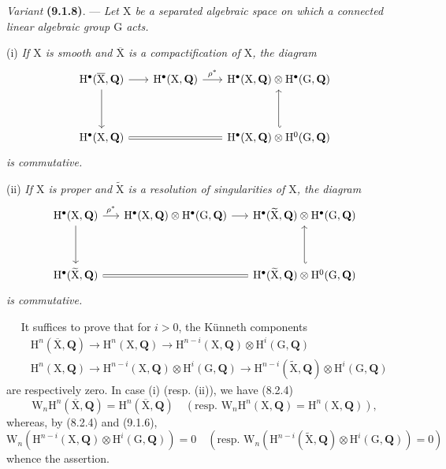 \documentclass[11pt,leqno]{article}
\newcommand{\Page}[1]{\ifvmode\noindent\else\unskip\ \fi{\footnotesize\textcolor{gray}{[p.\,#1]}}\ \ignorespaces}
\begin{document}
\textit{Variant} \textbf{(9.1.8)}. — \textit{Let \(\mathrm{X}\) be a separated algebraic space on which a connected linear algebraic group \(\mathrm{G}\) acts.}

(i) \textit{If \(\mathrm{X}\) is smooth and \(\overline{\mathrm{X}}\) is a compactification of \(\mathrm{X}\), the diagram}
\[
\begin{tikzcd}[ampersand replacement=\&, column sep=1.8em, row sep=3.5em]
\mathrm{H}^{\bullet}(\overline{\mathrm{X}},\mathbf{Q})
  \arrow[r] \arrow[d]
\&
\mathrm{H}^{\bullet}(\mathrm{X},\mathbf{Q})
  \arrow[r, "\rho^{*}"]
\&
\mathrm{H}^{\bullet}(\mathrm{X},\mathbf{Q})\otimes
\mathrm{H}^{\bullet}(\mathrm{G},\mathbf{Q})
\\
\mathrm{H}^{\bullet}(\mathrm{X},\mathbf{Q})
  \arrow[rr, equal]
\& \&
\mathrm{H}^{\bullet}(\mathrm{X},\mathbf{Q})\otimes
\mathrm{H}^{0}(\mathrm{G},\mathbf{Q})
  \arrow[u, hook']
\end{tikzcd}
\]
\textit{is commutative.}

(ii) \textit{If \(\mathrm{X}\) is proper and \(\widetilde{\mathrm{X}}\) is a resolution of singularities of \(\mathrm{X}\), the diagram}
\[
\begin{tikzcd}[ampersand replacement=\&, column sep=1.5em, row sep=3.5em]
\mathrm{H}^{\bullet}(\mathrm{X},\mathbf{Q})
  \arrow[r, "\rho^{*}"] \arrow[d]
\&
\mathrm{H}^{\bullet}(\mathrm{X},\mathbf{Q})\otimes
\mathrm{H}^{\bullet}(\mathrm{G},\mathbf{Q})
  \arrow[r]
\&
\mathrm{H}^{\bullet}(\widetilde{\mathrm{X}},\mathbf{Q})\otimes
\mathrm{H}^{\bullet}(\mathrm{G},\mathbf{Q})
\\
\mathrm{H}^{\bullet}(\widetilde{\mathrm{X}},\mathbf{Q})
  \arrow[rr, equal]
\& \&
\mathrm{H}^{\bullet}(\widetilde{\mathrm{X}},\mathbf{Q})\otimes
\mathrm{H}^{0}(\mathrm{G},\mathbf{Q})
  \arrow[u, hook']
\end{tikzcd}
\]
\textit{is commutative.}

\Page{48}
It suffices to prove that for \(i>0\), the Künneth components
\[
\begin{aligned}
&\mathrm{H}^{n}(\overline{\mathrm{X}},\mathbf{Q})
\to\mathrm{H}^{n}(\mathrm{X},\mathbf{Q})
\to\mathrm{H}^{n-i}(\mathrm{X},\mathbf{Q})\otimes\mathrm{H}^{i}(\mathrm{G},\mathbf{Q})
\\
&\mathrm{H}^{n}(\mathrm{X},\mathbf{Q})
\to\mathrm{H}^{n-i}(\mathrm{X},\mathbf{Q})\otimes\mathrm{H}^{i}(\mathrm{G},\mathbf{Q})
\to\mathrm{H}^{n-i}(\widetilde{\mathrm{X}},\mathbf{Q})\otimes\mathrm{H}^{i}(\mathrm{G},\mathbf{Q})
\end{aligned}
\]
are respectively zero. In case (i) (resp. (ii)), we have (8.2.4)
\[
\mathrm{W}_{n}\mathrm{H}^{n}(\overline{\mathrm{X}},\mathbf{Q})
=\mathrm{H}^{n}(\overline{\mathrm{X}},\mathbf{Q})
\quad
(\text{resp. }\mathrm{W}_{n}\mathrm{H}^{n}(\mathrm{X},\mathbf{Q})
=\mathrm{H}^{n}(\mathrm{X},\mathbf{Q})),
\]
whereas, by (8.2.4) and (9.1.6),
\[
\mathrm{W}_{n}(\mathrm{H}^{n-i}(\mathrm{X},\mathbf{Q})\otimes\mathrm{H}^{i}(\mathrm{G},\mathbf{Q}))=0
\quad
(\text{resp. }\mathrm{W}_{n}(\mathrm{H}^{n-i}(\widetilde{\mathrm{X}},\mathbf{Q})\otimes\mathrm{H}^{i}(\mathrm{G},\mathbf{Q}))=0)
\]
whence the assertion.
\end{document}
